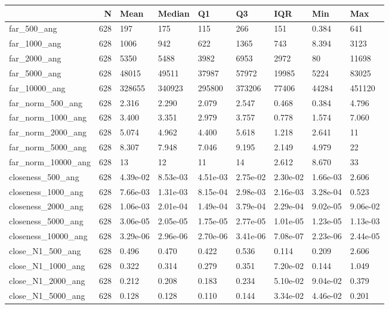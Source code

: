 \begin{tabular}{lrlllllll}
\toprule
 & N & Mean & Median & Q1 & Q3 & IQR & Min & Max \\
\midrule
far\_500\_ang & 628 & 197 & 175 & 115 & 266 & 151 & 0.384 & 641 \\
far\_1000\_ang & 628 & 1006 & 942 & 622 & 1365 & 743 & 8.394 & 3123 \\
far\_2000\_ang & 628 & 5350 & 5488 & 3982 & 6953 & 2972 & 80 & 11698 \\
far\_5000\_ang & 628 & 48015 & 49511 & 37987 & 57972 & 19985 & 5224 & 83025 \\
far\_10000\_ang & 628 & 328655 & 340923 & 295800 & 373206 & 77406 & 44284 & 451120 \\
far\_norm\_500\_ang & 628 & 2.316 & 2.290 & 2.079 & 2.547 & 0.468 & 0.384 & 4.796 \\
far\_norm\_1000\_ang & 628 & 3.400 & 3.351 & 2.979 & 3.757 & 0.778 & 1.574 & 7.060 \\
far\_norm\_2000\_ang & 628 & 5.074 & 4.962 & 4.400 & 5.618 & 1.218 & 2.641 & 11 \\
far\_norm\_5000\_ang & 628 & 8.307 & 7.948 & 7.046 & 9.195 & 2.149 & 4.979 & 22 \\
far\_norm\_10000\_ang & 628 & 13 & 12 & 11 & 14 & 2.612 & 8.670 & 33 \\
closeness\_500\_ang & 628 & 4.39e-02 & 8.53e-03 & 4.51e-03 & 2.75e-02 & 2.30e-02 & 1.66e-03 & 2.606 \\
closeness\_1000\_ang & 628 & 7.66e-03 & 1.31e-03 & 8.15e-04 & 2.98e-03 & 2.16e-03 & 3.28e-04 & 0.523 \\
closeness\_2000\_ang & 628 & 1.06e-03 & 2.01e-04 & 1.49e-04 & 3.79e-04 & 2.29e-04 & 9.02e-05 & 9.06e-02 \\
closeness\_5000\_ang & 628 & 3.06e-05 & 2.05e-05 & 1.75e-05 & 2.77e-05 & 1.01e-05 & 1.23e-05 & 1.13e-03 \\
closeness\_10000\_ang & 628 & 3.29e-06 & 2.96e-06 & 2.70e-06 & 3.41e-06 & 7.08e-07 & 2.23e-06 & 2.44e-05 \\
close\_N1\_500\_ang & 628 & 0.496 & 0.470 & 0.422 & 0.536 & 0.114 & 0.209 & 2.606 \\
close\_N1\_1000\_ang & 628 & 0.322 & 0.314 & 0.279 & 0.351 & 7.20e-02 & 0.144 & 1.049 \\
close\_N1\_2000\_ang & 628 & 0.212 & 0.208 & 0.183 & 0.234 & 5.10e-02 & 9.04e-02 & 0.379 \\
close\_N1\_5000\_ang & 628 & 0.128 & 0.128 & 0.110 & 0.144 & 3.34e-02 & 4.46e-02 & 0.201 \\

\end{tabular}
